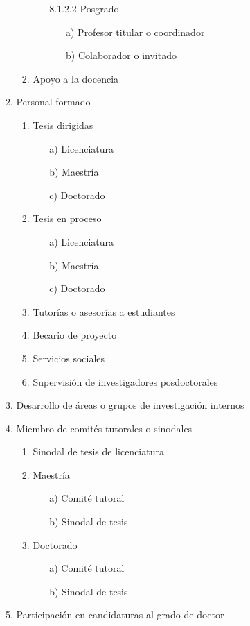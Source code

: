 \documentclass[12pt]{report}
\begin{document}
\begin{enumerate}
\begin{enumerate}
\begin{enumerate}
\begin{enumerate}
			\item [8.1.2.2]Posgrado
				\begin{itemize}
				\item[a)] Profesor titular o coordinador
				\item[b)] Colaborador o invitado
				\end{itemize}
			\end{enumerate}
	    \item Apoyo a la docencia

		\end{enumerate}

	\item Personal formado
		\begin{enumerate}
		\item Tesis dirigidas
			\begin{itemize}
			\item[a)] Licenciatura
			\item[b)] Maestría
			\item[c)] Doctorado
			\end{itemize}
        \item Tesis en proceso
        	\begin{itemize}
			\item[a)] Licenciatura
			\item[b)] Maestría
			\item[c)] Doctorado
			\end{itemize}

		\item Tutorías o asesorías a estudiantes
		\item Becario de proyecto
		\item Servicios sociales
		\item Supervisión de investigadores posdoctorales
		\end{enumerate}
	\item Desarrollo de áreas o grupos de investigación internos
	\item Miembro de comités tutorales o sinodales
		\begin{enumerate}
		\item Sinodal de tesis de licenciatura
		\item Maestría
			\begin{itemize}
			\item[a)] Comité tutoral
			\item[b)] Sinodal de tesis
			\end{itemize}
		\item Doctorado
			\begin{itemize}
			\item[a)] Comité tutoral
			\item[b)] Sinodal de tesis
			\end{itemize}
		\end{enumerate}
	\item Participación en candidaturas al grado de doctor
	\end{enumerate}


\end{enumerate}
\end{document}
